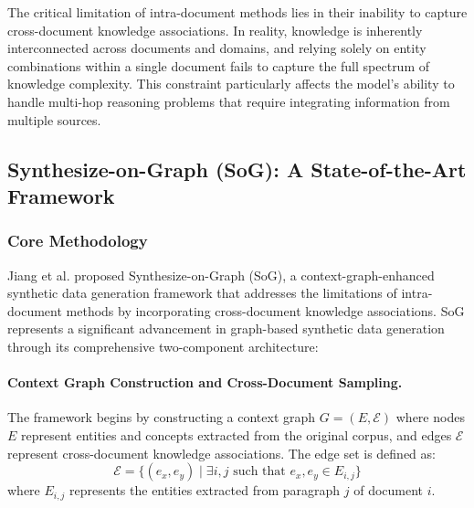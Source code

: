 \documentclass[11pt,a4paper]{article}
\begin{document}
The critical limitation of intra-document methods lies in their inability to capture cross-document knowledge associations. In reality, knowledge is inherently interconnected across documents and domains, and relying solely on entity combinations within a single document fails to capture the full spectrum of knowledge complexity. This constraint particularly affects the model's ability to handle multi-hop reasoning problems that require integrating information from multiple sources.

\subsection{Synthesize-on-Graph (SoG): A State-of-the-Art Framework}

\subsubsection{Core Methodology}

Jiang et al. \cite{jiang2025synthesize} proposed Synthesize-on-Graph (SoG), a context-graph-enhanced synthetic data generation framework that addresses the limitations of intra-document methods by incorporating cross-document knowledge associations. SoG represents a significant advancement in graph-based synthetic data generation through its comprehensive two-component architecture:

\paragraph{Context Graph Construction and Cross-Document Sampling.}
The framework begins by constructing a context graph $G = (E, \mathcal{E})$ where nodes $E$ represent entities and concepts extracted from the original corpus, and edges $\mathcal{E}$ represent cross-document knowledge associations. The edge set is defined as:
\begin{equation}
\mathcal{E} = \{(e_x, e_y) \mid \exists i, j \text{ such that } e_x, e_y \in E_{i,j}\}
\end{equation}
where $E_{i,j}$ represents the entities extracted from paragraph $j$ of document $i$.
\end{document}
